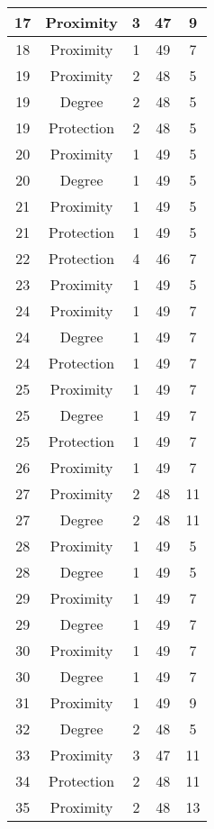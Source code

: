 \documentclass[results.tex]{subfiles}
\begin{document}
\begin{center}
\begin{tabular}{| c || c | c | c | c |}
    17 & Proximity & 3 & 47 & 9 \\ 
    \hline
    18 & Proximity & 1 & 49 & 7 \\ 
    \hline
    19 & Proximity & 2 & 48 & 5 \\ 
    \hline
    19 & Degree & 2 & 48 & 5 \\ 
    \hline
    19 & Protection & 2 & 48 & 5 \\ 
    \hline
    20 & Proximity & 1 & 49 & 5 \\ 
    \hline
    20 & Degree & 1 & 49 & 5 \\ 
    \hline
    21 & Proximity & 1 & 49 & 5 \\ 
    \hline
    21 & Protection & 1 & 49 & 5 \\ 
    \hline
    22 & Protection & 4 & 46 & 7 \\ 
    \hline
    23 & Proximity & 1 & 49 & 5 \\ 
    \hline
    24 & Proximity & 1 & 49 & 7 \\ 
    \hline
    24 & Degree & 1 & 49 & 7 \\ 
    \hline
    24 & Protection & 1 & 49 & 7 \\ 
    \hline
    25 & Proximity & 1 & 49 & 7 \\ 
    \hline
    25 & Degree & 1 & 49 & 7 \\ 
    \hline
    25 & Protection & 1 & 49 & 7 \\ 
    \hline
    26 & Proximity & 1 & 49 & 7 \\ 
    \hline
    27 & Proximity & 2 & 48 & 11 \\ 
    \hline
    27 & Degree & 2 & 48 & 11 \\ 
    \hline
    28 & Proximity & 1 & 49 & 5 \\ 
    \hline
    28 & Degree & 1 & 49 & 5 \\ 
    \hline
    29 & Proximity & 1 & 49 & 7 \\ 
    \hline
    29 & Degree & 1 & 49 & 7 \\ 
    \hline
    30 & Proximity & 1 & 49 & 7 \\ 
    \hline
    30 & Degree & 1 & 49 & 7 \\ 
    \hline
    31 & Proximity & 1 & 49 & 9 \\ 
    \hline
    32 & Degree & 2 & 48 & 5 \\ 
    \hline
    33 & Proximity & 3 & 47 & 11 \\ 
    \hline
    34 & Protection & 2 & 48 & 11 \\ 
    \hline
    35 & Proximity & 2 & 48 & 13 \\ 

\end{tabular}
\end{center}
\end{document}
